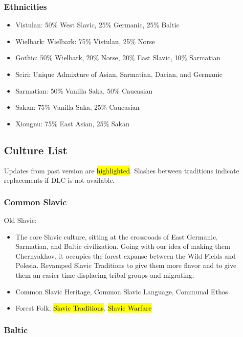 \documentclass{article}
\begin{document}
	\subsubsection{Ethnicities}
	\begin{itemize}
		\item Vistulan: 50\% West Slavic, 25\% Germanic, 25\% Baltic
		\item Wielbark: Wielbark: 75\% Vistulan, 25\% Norse
		\item Gothic: 50\% Wielbark, 20\% Norse, 20\% East Slavic, 10\% Sarmatian
		\item Sciri: Unique Admixture of Asian, Sarmatian, Dacian, and Germanic
		\item Sarmatian: 50\% Vanilla Saka, 50\% Caucasian
		\item Sakan: 75\% Vanilla Saka, 25\% Caucasian
		\item Xiongnu: 75\% East Asian, 25\% Sakan
	\end{itemize}
	
	\subsection{Culture List}
	Updates from past version are \hl{highlighted}.
	Slashes between traditions indicate replacements if DLC is not available.
	
	\subsubsection{Common Slavic}
	
	Old Slavic:
	\begin{itemize}
		\item The core Slavic culture, sitting at the crossroads of East Germanic, Sarmatian, and Baltic civilization. Going with our idea of making them Chernyakhov, it occupies the forest expanse between the Wild Fields and Polesia.
		\newline
		Revamped Slavic Traditions to give them more flavor and to give them an easier time displacing tribal groups and migrating.
		\item Common Slavic Heritage, Common Slavic Language, Communal Ethos
		\item Forest Folk, \hl{Slavic Traditions}, \hl{Slavic Warfare}
	\end{itemize}
	
	\subsubsection{Baltic}
	
\end{document}
